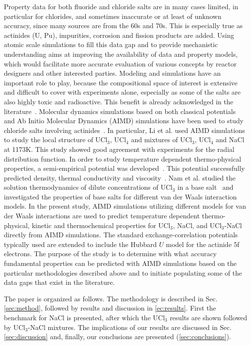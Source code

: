 \documentclass[preprint,3p,10pt,twocolumn,number,sort&compress]{elsarticle}
\begin{document}
Property data for both fluoride and chloride salts are in many cases limited, in particular for chlorides, and sometimes inaccurate or at least of unknown accuracy, since many sources are from the 60s and 70s. This is especially true as actinides (U, Pu), impurities, corrosion and fission products are added. Using atomic scale simulations to fill this data gap and to provide mechanistic understanding aims at improving the availability of data and property models, which would facilitate more accurate evaluation of various concepts by reactor designers and other interested parties. 
Modeling and simulations have an important role to play, because the compositional space of interest is extensive and difficult to cover with experiments alone, especially as some of the salts are also highly toxic and radioactive. This benefit is already acknowledged  in the literature~\cite{}. Molecular dynamics simulations based on both classical potentials and Ab Initio Molecular Dynamics (AIMD) simulations have been used to study chloride salts involving actinides~\cite{}. In particular, Li et al. used AIMD simulations to study the local structure of UCl$_3$, UCl$_4$ and mixtures of UCl$_3$, UCl$_4$ and NaCl at 1173K. This study showed good agreement with experiments for the radial distribution function. In order to study temperature dependent thermo-physical properties, a semi-empirical potential was developed~\cite{}. This potential successfully predicted density, thermal conductivity and viscosity~\cite{}. Nam et al. studied the solution thermodynamics of dilute concentrations of UCl$_3$ in a base salt~\cite{} and investigated the properties of base salts for different van der Waals interaction models. In the present study, AIMD simulations utilizing different models for van der Waals interactions are used to predict temperature dependent thermo-physical, kinetic and thermochemical properties for UCl$_3$, NaCl, and UCl$_3$-NaCl directly from AIMD simulations. The standard exchange-correlation potentials typically used are extended to include the Hubbard $U$  model for the actinide 5f electrons. The purpose of the study is to determine with what accuracy fundamental properties can be predicted with AIMD simulations based on the particular methodologies described above and to initiate populating some of the data gaps that exist in the literature. 

The paper is organized as follows. The methodology is described in Sec. \ref{sec:method}, followed by results and discussion in \ref{ec:results}. First the benchmark for NaCl is presented, after which the UCl$_3$ results are shown followed by UCl$_3$-NaCl mixtures. The implications of our results are discussed in Sec. \ref{sec:discussion} and, finally, our conclusions are presented (\ref{sec:conclusions}). 
\end{document}
